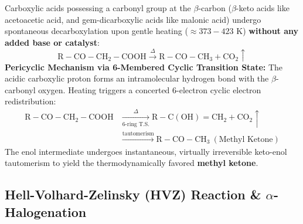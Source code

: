\documentclass[10pt,twoside,openright]{book}
\begin{document}
\begin{conceptbox}
Carboxylic acids possessing a carbonyl group at the $\beta$-carbon ($\beta$-keto acids like acetoacetic acid, and gem-dicarboxylic acids like malonic acid) undergo spontaneous decarboxylation upon gentle heating ($\approx 373-423\text{ K}$) \textbf{without any added base or catalyst}:
\begin{equation}
  \mathrm{R-CO-CH_2-COOH} \xrightarrow{\Delta} \mathrm{R-CO-CH_3} + \mathrm{CO_2}\uparrow
\end{equation}
\textbf{Pericyclic Mechanism via 6-Membered Cyclic Transition State:}
The acidic carboxylic proton forms an intramolecular hydrogen bond with the $\beta$-carbonyl oxygen. Heating triggers a concerted 6-electron cyclic electron redistribution:
\begin{align}
  \mathrm{R-CO-CH_2-COOH} &\xrightarrow[\text{6-ring T.S.}]{\Delta} \mathrm{R-C(OH)=CH_2} + \mathrm{CO_2}\uparrow\\
  &\xrightarrow{\text{tautomerism}} \mathrm{R-CO-CH_3} \ (\text{Methyl Ketone})
\end{align}
The enol intermediate undergoes instantaneous, virtually irreversible keto-enol tautomerism to yield the thermodynamically favored \textbf{methyl ketone}.
\end{conceptbox}

\subsection{Hell-Volhard-Zelinsky (HVZ) Reaction \& \texorpdfstring{$\alpha$}{alpha}-Halogenation}
\end{document}
